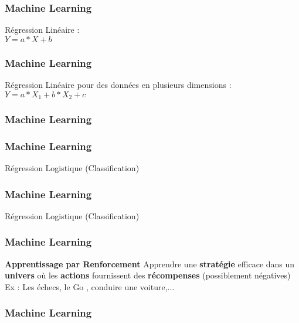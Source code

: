 \documentclass{formation}
\begin{document}
\begin{frame}
  \frametitle{Machine Learning}
  Régression Linéaire : \\
  $Y = a*X + b$
\end{frame}

\begin{frame}
  \frametitle{Machine Learning}
  Régression Linéaire pour des données en plusieurs dimensions : \\
  $Y = a*X_1 + b*X_2 + c$
\end{frame}

\begin{frame}
  \frametitle{Machine Learning}
\end{frame}

\begin{frame}
  \frametitle{Machine Learning}
  Régression Logistique (Classification)
\end{frame}

\begin{frame}
  \frametitle{Machine Learning}
  Régression Logistique (Classification)
\end{frame}

\begin{frame}
  \frametitle{Machine Learning}
  \textbf{Apprentissage par Renforcement}
  \newline \newline
  Apprendre une \textbf{stratégie} efficace dans un \textbf{univers} où les \textbf{actions} fournissent des \textbf{récompenses} (possiblement négatives)
  \newline
  Ex : Les échecs, le Go , conduire une voiture,...
\end{frame}

\begin{frame}
  \frametitle{Machine Learning}
\end{frame}
\end{document}
